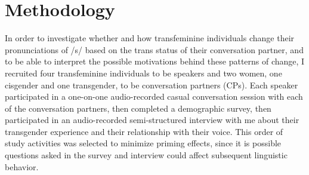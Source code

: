 \documentclass[12pt,twoside]{reedthesis}
\begin{document}






\chapter{Methodology}

In order to investigate whether and how transfeminine individuals change their pronunciations of /s/ based on the trans status of their conversation partner, and to be able to interpret the possible motivations behind these patterns of change, I recruited four transfeminine individuals to be speakers and two women, one cisgender and one transgender, to be conversation partners (CPs). Each speaker participated in a one-on-one audio-recorded casual conversation session with each of the conversation partners, then completed a demographic survey, then participated in an audio-recorded semi-structured interview with me about their transgender experience and their relationship with their voice. This order of study activities was selected to minimize priming effects, since it is possible questions asked in the survey and interview could affect subsequent linguistic behavior.
\end{document}
